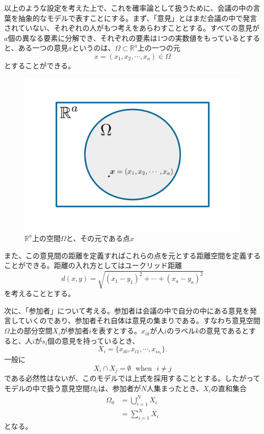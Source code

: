 以上のような設定を考えた上で、これを確率論として扱うために、会議の中の言葉を抽象的なモデルで表すことにする。まず、「意見」とはまだ会議の中で発言されていない、それぞれの人がもつ考えをあらわすこととする。すべての意見が$a$個の異なる要素に分解でき、それぞれの要素は1つの実数値をもっているとすると、ある一つの意見$x$というのは、$\Omega \subset \mathbb{R}^{a}$上の一つの元
$$x = (x_{1}, x_{2}, \cdots ,x_{a}) \in \Omega$$
とすることができる。
\begin{figure}[H]
    \begin{center}
        \includegraphics[width=12.5cm]{../img/ideaspace.jpg}
        \caption{$\mathbb{R}^{a}$上の空間$\Omega$と、その元である点$x$}
        \label{fig:f1}
    \end{center}
\end{figure}

また、この意見間の距離を定義すればこれらの点を元とする距離空間を定義することができる。距離の入れ方としてはユークリッド距離
$$d(x, y) = \sqrt{(x_{1} - y_{1})^{2} + \cdots + (x_{a} - y_{a})^{2}}$$
を考えることとする。

次に、「参加者」について考える。参加者は会議の中で自分の中にある意見を発言していくのであり、参加者それ自体は意見の集まりである。すなわち意見空間$\Omega$上の部分空間$X_{i}$が参加者$i$を表すとする。$x_{ik}$が人$i$のラベル$k$の意見であるとすると、人$i$が$s_{i}$個の意見を持っているとき、
$$X_{i} = \{x_{i0}, x_{i1}, \cdots , x_{is_{i}}\}.$$
一般に
$$X_{i}\cap X_{j} = \emptyset\ \ \  \text{when}\ \ \ i \neq j$$
である必然性はないが、このモデルでは上式を採用することとする。したがってモデルの中で扱う意見空間$\Omega_{0}$は、参加者が$N$人集まったとき、$X_{i}$の直和集合
\begin{align}\Omega_{0} &= \bigcup_{i = 1}^{N} X_{i} \nonumber \\
&= \sum_{i=1}^{N} X_{i} \end{align}
となる。

